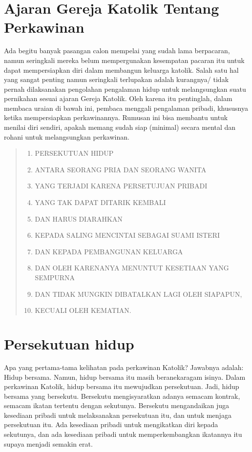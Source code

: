 

\section*{Ajaran Gereja Katolik Tentang Perkawinan}

Ada begitu banyak pasangan calon mempelai yang sudah lama ber­pacaran, namun seringkali mereka belum mempergunakan kesempatan pacaran itu untuk dapat mempersiapkan diri dalam membangun keluarga katolik. Salah satu hal yang sangat penting namun seringkali terlupakan adalah kurangnya/ tidak pernah dilaksanakan pengolahan pengalaman hidup untuk melangsungkan suatu pernikahan sesuai ajaran Gereja Katolik. Oleh karena itu pentinglah, dalam membaca uraian di bawah ini, pembaca menggali pengalaman pribadi, khususnya ketika mempersiapkan perkawinannya. Rumusan ini bisa membantu un­tuk menilai diri sendiri, apakah memang sudah siap (minimal) secara mental dan rohani untuk melangsungkan perkawinan.

\begin{quote}
\begin{enumerate}[label=\Alph*.]
\item PERSEKUTUAN HIDUP  
\item ANTARA SEORANG PRIA DAN SEORANG WANITA  
\item YANG TERJADI KARENA PERSETUJUAN PRIBADI  
\item YANG TAK DAPAT DITA­RIK KEMBALI 
\item DAN HARUS DIARAHKAN 
\item KEPADA SALING MENCINTAI SEBAGAI SUAMI ISTERI 
\item DAN KEPADA PEMBANGUNAN KELUARGA 
\item DAN OLEH KARENANYA MENUNTUT KESETIAAN YANG SEMPURNA 
\item DAN TIDAK MUNGKIN DIBATALKAN LAGI OLEH SIAPAPUN, 
\item KECUALI OLEH KEMATIAN.
\end{enumerate}
\end{quote}

\section{Persekutuan hidup}
Apa yang pertama-tama kelihatan pada perkawinan Katolik? Jawabnya adalah: Hidup bersama. Namun, hidup bersama itu masih berane­karagam isinya. Dalam perkawinan Katolik, hidup bersama itu mewujudkan persekutuan. Jadi, hidup bersama yang bersekutu. Bersekutu mengisyaratkan adanya semacam kontrak, semacam ikatan tertentu dengan sekutunya. Bersekutu mengandaikan juga kesediaan pribadi untuk melaksanakan persekutuan itu, dan untuk menjaga persekutuan itu. Ada kesediaan pribadi untuk mengikatkan diri kepada sekutunya, dan ada kesediaan pribadi untuk memperkembangkan ikatannya itu supaya menjadi semakin erat.

